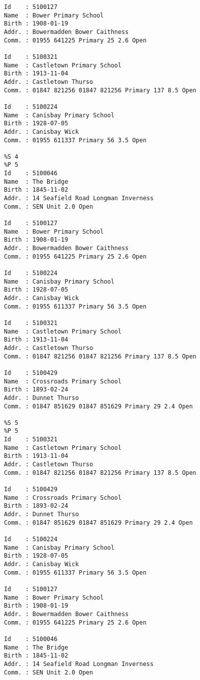 \begin{verbatim}
      Id    : 5100127
      Name  : Bower Primary School
      Birth : 1908-01-19
      Addr. : Bowermadden Bower Caithness
      Comm. : 01955 641225 Primary 25 2.6 Open

      Id    : 5100321
      Name  : Castletown Primary School
      Birth : 1913-11-04
      Addr. : Castletown Thurso
      Comm. : 01847 821256 01847 821256 Primary 137 8.5 Open

      Id    : 5100224
      Name  : Canisbay Primary School
      Birth : 1928-07-05
      Addr. : Canisbay Wick
      Comm. : 01955 611337 Primary 56 3.5 Open

      %S 4
      %P 5
      Id    : 5100046
      Name  : The Bridge
      Birth : 1845-11-02
      Addr. : 14 Seafield Road Longman Inverness
      Comm. : SEN Unit 2.0 Open

      Id    : 5100127
      Name  : Bower Primary School
      Birth : 1908-01-19
      Addr. : Bowermadden Bower Caithness
      Comm. : 01955 641225 Primary 25 2.6 Open

      Id    : 5100224
      Name  : Canisbay Primary School
      Birth : 1928-07-05
      Addr. : Canisbay Wick
      Comm. : 01955 611337 Primary 56 3.5 Open

      Id    : 5100321
      Name  : Castletown Primary School
      Birth : 1913-11-04
      Addr. : Castletown Thurso
      Comm. : 01847 821256 01847 821256 Primary 137 8.5 Open

      Id    : 5100429
      Name  : Crossroads Primary School
      Birth : 1893-02-24
      Addr. : Dunnet Thurso
      Comm. : 01847 851629 01847 851629 Primary 29 2.4 Open

      %S 5
      %P 5
      Id    : 5100321
      Name  : Castletown Primary School
      Birth : 1913-11-04
      Addr. : Castletown Thurso
      Comm. : 01847 821256 01847 821256 Primary 137 8.5 Open

      Id    : 5100429
      Name  : Crossroads Primary School
      Birth : 1893-02-24
      Addr. : Dunnet Thurso
      Comm. : 01847 851629 01847 851629 Primary 29 2.4 Open

      Id    : 5100224
      Name  : Canisbay Primary School
      Birth : 1928-07-05
      Addr. : Canisbay Wick
      Comm. : 01955 611337 Primary 56 3.5 Open

      Id    : 5100127
      Name  : Bower Primary School
      Birth : 1908-01-19
      Addr. : Bowermadden Bower Caithness
      Comm. : 01955 641225 Primary 25 2.6 Open

      Id    : 5100046
      Name  : The Bridge
      Birth : 1845-11-02
      Addr. : 14 Seafield Road Longman Inverness
      Comm. : SEN Unit 2.0 Open
    \end{verbatim}
